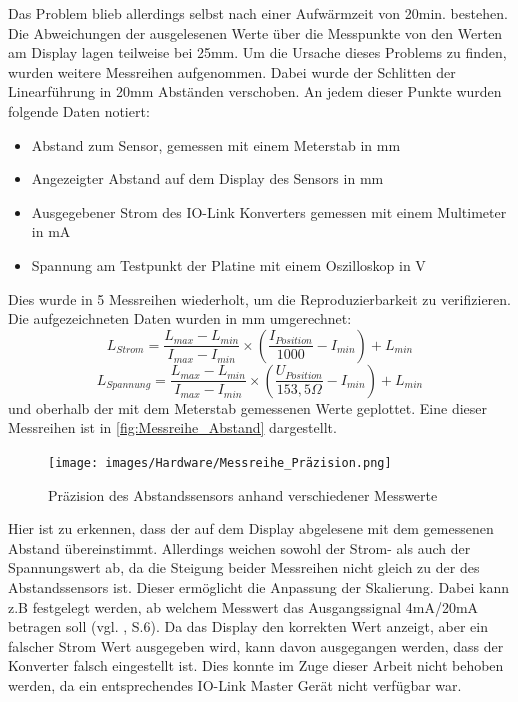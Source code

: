 Das Problem blieb allerdings selbst nach einer Aufwärmzeit von 20min. bestehen. Die Abweichungen der ausgelesenen Werte über die Messpunkte von den Werten am Display lagen teilweise bei 25mm. Um die Ursache dieses Problems zu finden, wurden weitere Messreihen aufgenommen. Dabei wurde der Schlitten der Linearführung in 20mm Abständen verschoben. An jedem dieser Punkte wurden folgende Daten notiert:
\begin{itemize}
	\item Abstand zum Sensor, gemessen mit einem Meterstab in mm
	\item Angezeigter Abstand auf dem Display des Sensors in mm
	\item Ausgegebener Strom des IO-Link Konverters gemessen mit einem Multimeter in mA
	\item Spannung am Testpunkt der Platine mit einem Oszilloskop in V
\end{itemize}
Dies wurde in 5 Messreihen wiederholt, um die Reproduzierbarkeit zu verifizieren. Die aufgezeichneten Daten wurden in mm umgerechnet:
\begin{equation}
	L_{Strom} = \frac{L_{max}-L_{min}}{I_{max}-I_{min}}\times(\frac{I_{Position}}{1000}-I_{min}) + L_{min}
\end{equation}
\begin{equation}
	L_{Spannung} = \frac{L_{max}-L_{min}}{I_{max}-I_{min}}\times(\frac{U_{Position}}{153,5\Omega}-I_{min}) + L_{min}
\end{equation}
 und oberhalb der mit dem Meterstab gemessenen Werte geplottet. Eine dieser Messreihen ist in \autoref{fig:Messreihe_Abstand} dargestellt.
\begin{figure}[H]
	\centering
	\texttt{[image: images/Hardware/Messreihe\_Präzision.png]}
	\caption{Präzision des Abstandssensors anhand verschiedener Messwerte}
	\label{fig:Messreihe_Abstand}
\end{figure}
\noindent Hier ist zu erkennen, dass der auf dem Display abgelesene mit dem gemessenen Abstand übereinstimmt. Allerdings weichen sowohl der Strom- als auch der Spannungswert ab, da die Steigung beider Messreihen nicht gleich zu der des Abstandssensors ist. Dieser ermöglicht die Anpassung der Skalierung. Dabei kann z.B festgelegt werden, ab welchem Messwert das Ausgangssignal 4mA/20mA betragen soll (vgl. \cite{EIO104_Manual}, S.6). Da das Display den korrekten Wert anzeigt, aber ein falscher Strom Wert ausgegeben wird, kann davon ausgegangen werden, dass der Konverter falsch eingestellt ist. Dies konnte im Zuge dieser Arbeit nicht behoben werden, da ein entsprechendes IO-Link Master Gerät nicht verfügbar war.
